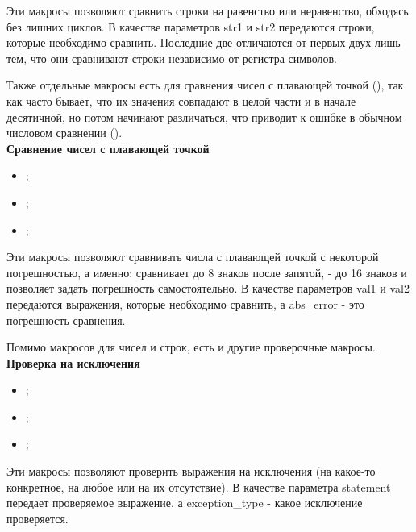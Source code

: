 \documentclass[a4paper, 11pt]{article}
\newcommand{\assertiontype}[1]{{\large \bfseries #1}}
\begin{document}
	Эти макросы позволяют сравнить строки на равенство или неравенство, обходясь без лишних циклов. В качестве параметров str1 и str2 передаются строки, которые необходимо сравнить. Последние две отличаются от первых двух лишь тем, что они сравнивают строки независимо от регистра символов.
	
	
	Также отдельные макросы есть для сравнения чисел с плавающей точкой (), так как часто бывает, что их значения совпадают в целой части и в начале десятичной, но потом начинают различаться, что приводит к ошибке в обычном числовом сравнении ().\\
	
	\assertiontype{Сравнение чисел с плавающей точкой}
	
	\begin{itemize}
		\item {};
		\item {};
		\item {};
	\end{itemize}

	Эти макросы позволяют сравнивать числа с плавающей точкой с некоторой погрешностью, а именно:  сравнивает до 8 знаков после запятой,  - до 16 знаков и  позволяет задать погрешность самостоятельно. В качестве параметров val1 и val2 передаются выражения, которые необходимо сравнить, а abs\_error - это погрешность сравнения.
	
	
	Помимо макросов для чисел и строк, есть и другие проверочные макросы.\\
	
	\assertiontype{Проверка на исключения}
	
	\begin{itemize}
		\item {};
		\item {};
		\item {};
	\end{itemize}

	Эти макросы позволяют проверить выражения на исключения (на какое-то конкретное, на любое или на их отсутствие). В качестве параметра statement передает проверяемое выражение, а exception\_type - какое исключение проверяется.
	
\end{document}

